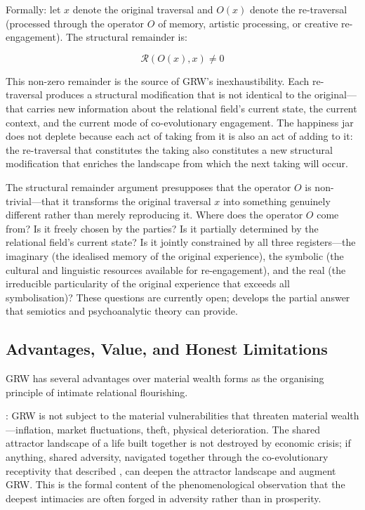 Formally: let $x$ denote the original traversal and $O(x)$ denote the re-traversal (processed through the operator $O$ of memory, artistic processing, or creative re-engagement). The structural remainder is:

$$\mathcal{R}(O(x), x) \neq 0$$

This non-zero remainder is the source of GRW's inexhaustibility. Each re-traversal produces a structural modification that is not identical to the original---that carries new information about the relational field's current state, the current context, and the current mode of co-evolutionary engagement. The happiness jar does not deplete because each act of taking from it is also an act of adding to it: the re-traversal that constitutes the taking also constitutes a new structural modification that enriches the landscape from which the next taking will occur.

\begin{openquestion}
The structural remainder argument presupposes that the operator $O$ is non-trivial---that it transforms the original traversal $x$ into something genuinely different rather than merely reproducing it. Where does the operator $O$ come from? Is it freely chosen by the parties? Is it partially determined by the relational field's current state? Is it jointly constrained by all three registers---the imaginary (the idealised memory of the original experience), the symbolic (the cultural and linguistic resources available for re-engagement), and the real (the irreducible particularity of the original experience that exceeds all symbolisation)? These questions are currently open;  develops the partial answer that semiotics and psychoanalytic theory can provide.
\end{openquestion}

\subsection{Advantages, Value, and Honest Limitations}
\label{p15:subsec:advantages}

\noindent
GRW has several advantages over material wealth forms as the organising principle of intimate relational flourishing.

: GRW is not subject to the material vulnerabilities that threaten material wealth---inflation, market fluctuations, theft, physical deterioration. The shared attractor landscape of a life built together is not destroyed by economic crisis; if anything, shared adversity, navigated together through the co-evolutionary receptivity that  described \parencite{paperxiv}, can deepen the attractor landscape and augment GRW. This is the formal content of the phenomenological observation that the deepest intimacies are often forged in adversity rather than in prosperity.

